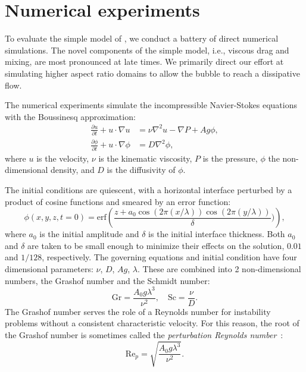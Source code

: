 \section{Numerical experiments} 

To evaluate the simple model of , we conduct a battery of direct numerical simulations.
The novel components of the simple model, i.e., viscous drag and mixing, are most pronounced at late times.
We primarily direct our effort at simulating higher aspect ratio domains to allow the bubble to reach a dissipative flow.

The numerical experiments simulate the incompressible Navier-Stokes equations with the Boussinesq approximation:
\begin{align}
\frac{\partial u}{\partial t} + u \cdot \nabla u &= \nu \nabla^2 u - \nabla P + A g \phi, \\
\frac{\partial \phi}{\partial t} + u \cdot \nabla \phi &= D \nabla^2 \phi,
\end{align}
where $u$ is the velocity,
$\nu$ is the kinematic viscosity,
$P$ is the pressure,
$\phi$ the non-dimensional density,
and $D$ is the diffusivity of $\phi$.

The initial conditions are quiescent, with a horizontal interface perturbed by a product of cosine functions and smeared by an error function:
\begin{equation}
\phi(x,y,z,t=0) = \text{erf}\left(\frac{z + a_0 \cos(2 \pi (x/\lambda)) \cos(2 \pi (y/\lambda))}{\delta})\right),
\end{equation}
where $a_0$ is the initial amplitude and $\delta$ is the initial interface thickness.
Both $a_0$ and $\delta$ are taken to be small enough to minimize their effects on the solution, $0.01$ and $1/128$, respectively.
The governing equations and initial condition have four dimensional parameters: $\nu$, $D$, $Ag$, $\lambda$.
These are combined into 2 non-dimensional numbers, the Grashof number and the Schmidt number:
\begin{equation}
\text{Gr} = \frac{A_0 g \lambda^3}{\nu^2}, \quad \text{Sc} = \frac{\nu}{D}.
\end{equation}
The Grashof number serves the role of a Reynolds number for instability problems without a consistent characteristic velocity.
For this reason, the root of the Grashof number is sometimes called the \textit{perturbation Reynolds number}~\cite{Wei2012}:
\begin{equation}
\text{Re}_p = \sqrt{\frac{A_0 g \lambda^3}{\nu^2}}.
\end{equation}

